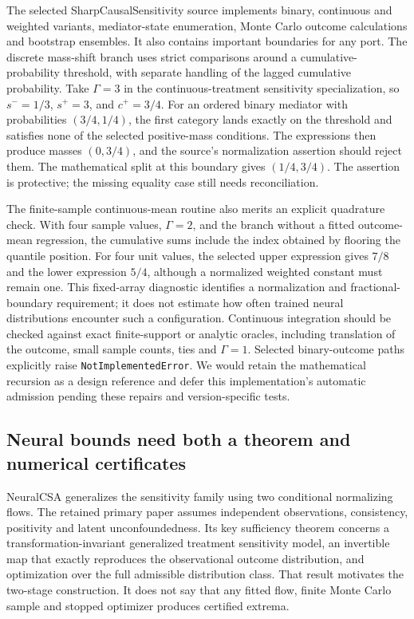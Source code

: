 The selected SharpCausalSensitivity source implements binary, continuous and weighted variants, mediator-state enumeration, Monte Carlo outcome calculations and bootstrap ensembles. It also contains important boundaries for any port. The discrete mass-shift branch uses strict comparisons around a cumulative-probability threshold, with separate handling of the lagged cumulative probability. Take $\Gamma=3$ in the continuous-treatment sensitivity specialization, so $s^-=1/3$, $s^+=3$, and $c^+=3/4$. For an ordered binary mediator with probabilities $(3/4,1/4)$, the first category lands exactly on the threshold and satisfies none of the selected positive-mass conditions. The expressions then produce masses $(0,3/4)$, and the source's normalization assertion should reject them. The mathematical split at this boundary gives $(1/4,3/4)$. The assertion is protective; the missing equality case still needs reconciliation. \citep{exec25_pymed_sharp,exec25_pymed_choice}

The finite-sample continuous-mean routine also merits an explicit quadrature check. With four sample values, $\Gamma=2$, and the branch without a fitted outcome-mean regression, the cumulative sums include the index obtained by flooring the quantile position. For four unit values, the selected upper expression gives $7/8$ and the lower expression $5/4$, although a normalized weighted constant must remain one. This fixed-array diagnostic identifies a normalization and fractional-boundary requirement; it does not estimate how often trained neural distributions encounter such a configuration. Continuous integration should be checked against exact finite-support or analytic oracles, including translation of the outcome, small sample counts, ties and $\Gamma=1$. Selected binary-outcome paths explicitly raise \texttt{NotImplementedError}. We would retain the mathematical recursion as a design reference and defer this implementation's automatic admission pending these repairs and version-specific tests. \citep{exec25_pymed_sharp,exec25_pymed_choice}

\subsection{Neural bounds need both a theorem and numerical certificates}
NeuralCSA generalizes the sensitivity family using two conditional normalizing flows. The retained primary paper assumes independent observations, consistency, positivity and latent unconfoundedness. Its key sufficiency theorem concerns a transformation-invariant generalized treatment sensitivity model, an invertible map that exactly reproduces the observational outcome distribution, and optimization over the full admissible distribution class. That result motivates the two-stage construction. It does not say that any fitted flow, finite Monte Carlo sample and stopped optimizer produces certified extrema. \citep{exec25_pymed_neural_paper}

